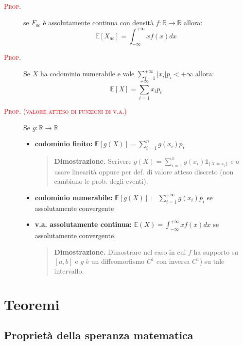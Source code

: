 \documentclass[a4paper,10pt]{article}
\newcommand{\myth}{\normalfont \scshape \textcolor{red}} %
\newcommand{\re}{\mathbb{R}} %
\newcommand{\ex}{\mathbb{E}} %
\theoremstyle{remark}
\theoremstyle{definition}
\newenvironment{dimo}{\begin{quote}\textbf{Dimostrazione.}}{\end{quote}} %
\begin{document}
\begin{description}
    \item[\myth{Prop.}] se $F_{ac}$ è assolutamente continua con densità $f:\re\to\re$ allora:
    $$\ex[X_{ac}]=\int_{-\infty}^{+\infty}xf(x)dx$$
    \item[\myth{Prop.}] Se $X$ ha codominio numerabile e vale $\sum_{i=1}^{+\infty}|x_i|p_i<+\infty$ allora:
    $$\ex[X]=\sum_{i=1}^{+\infty}x_ip_i$$
    \item[\myth{Prop. (valore atteso di funzioni di v.a.)}] Se $g:\re\to\re$
    \begin{itemize}
        \item \textbf{codominio finito:} $\ex[g(X)]=\sum_{i=1}^ng(x_i)p_i$
        \begin{dimo}
            Scrivere $g(X)=\sum_{i=1}^ng(x_i)\mathds{1}_{\{X=x_i\}}$ e o usare linearità oppure per def. di valore atteso discreto (non cambiano le prob. degli eventi).
        \end{dimo}
        \item \textbf{codominio numerabile:} $\ex[g(X)]=\sum_{i=1}^{+\infty}g(x_i)p_i$ se assolutamente convergente
        \item \textbf{v.a. assolutamente continua:}  $\ex(X)=\int_{-\infty}^{+\infty}xf(x)dx$ se assolutamente convergente.
        \begin{dimo}
            Dimostrare nel caso in cui $f$ ha supporto su $[a,b]$ e $g$ è un diffeomorfismo $C^1$ con inversa $C^1$) su tale intervallo.
        \end{dimo}
    \end{itemize}
\end{description}

\section*{Teoremi}
\subsection*{Proprietà della speranza matematica}
\end{document}
